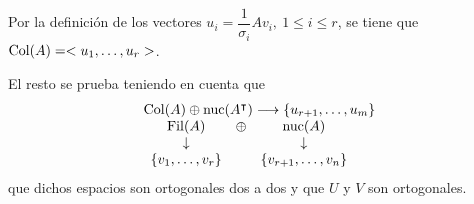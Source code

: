 Por la definición de los vectores $u_i=\dfrac{1}{\sigma_i}Av_i,\:1\le i\le r$, se tiene que $\operatorname{\mathrm{Col}}(A)=<u_1,\dots,u_r>$.

El resto se prueba teniendo en cuenta que \[ \begin{array}{l}
	\operatorname{\mathrm{Col}}(A)\oplus\operatorname{\mathrm{nuc}}(A^\intercal)\longrightarrow\{u_{r+1},\dots,u_m\}\\
	\begin{array}{ccc}
		\operatorname{\mathrm{Fil}}(A) & \oplus & \operatorname{\mathrm{nuc}}(A)\\
		\downarrow &  & \downarrow\\
		\{v_1,\dots,v_r\} & & \{v_{r+1},\dots,v_n\}
	\end{array}
\end{array} \]que dichos espacios son ortogonales dos a dos y que $U$ y $V$ son ortogonales.
